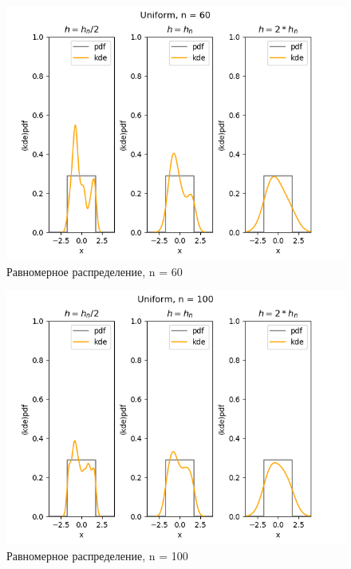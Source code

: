 \documentclass[../body.tex]{subfiles}
\begin{document}
\begin{figure}[H]
	\centering
	\includegraphics[width=\textwidth, height =0.4\textheight]{img/UniformKDE n = 60.png}
	\caption{Равномерное распределение, n = 60}
	\label{fig:uniform_kde_60}
\end{figure}

\begin{figure}[H]
	\centering
	\includegraphics[width=\textwidth, height =0.4\textheight]{img/UniformKDE n = 100.png}
	\caption{Равномерное распределение, n = 100}
	\label{fig:uniform_kde_100}
\end{figure}
\end{document}
